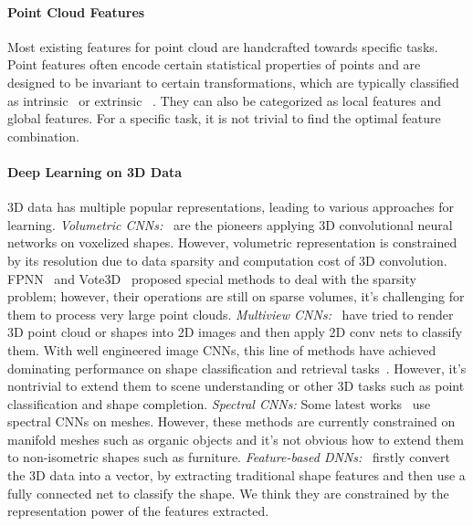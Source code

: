 \documentclass[10pt,twocolumn,letterpaper]{article}
\begin{document}
\paragraph{Point Cloud Features}
Most existing features for point cloud are handcrafted towards specific tasks. Point features often encode certain statistical properties of points and are designed to be invariant to certain transformations, which are typically classified as intrinsic~\cite{aubry2011wave, sun2009concise, bronstein2010scale} or extrinsic ~\cite{rusu2008aligning, rusu2009fast, ling2007shape, johnson1999using, chen2003visual}.  They can also be categorized as local features and global features. For a specific task, it is not trivial to find the optimal feature combination.










\paragraph{Deep Learning on 3D Data}


3D data has multiple popular representations, leading to various approaches for learning. 
\emph{Volumetric CNNs:}~\cite{wu20153d, maturana2015voxnet, qi2016volumetric} are the pioneers applying 3D convolutional neural networks on voxelized shapes. However, volumetric representation is constrained by its resolution due to data sparsity and computation cost of 3D convolution. FPNN~\cite{li2016fpnn} and Vote3D~\cite{wang2015voting} proposed special methods to deal with the sparsity problem; however, their operations are still on sparse volumes, it's challenging for them to process very large point clouds. 
\emph{Multiview CNNs:}~\cite{su15mvcnn, qi2016volumetric} have tried to render 3D point cloud or shapes into 2D images and then apply 2D conv nets to classify them. With well engineered image CNNs, this line of methods have achieved dominating performance on shape classification and retrieval tasks~\cite{savvashrec}. However, it's nontrivial to extend them to scene understanding or other 3D tasks such as point classification and shape completion. 
\emph{Spectral CNNs:} Some latest works~\cite{bruna2013spectral, masci2015geodesic} use spectral CNNs on meshes. However, these methods are currently constrained on manifold meshes such as organic objects and it's not obvious how to extend them to non-isometric shapes such as furniture. 
\emph{Feature-based DNNs:}~\cite{fang20153d,guo20153d} firstly convert the 3D data into a vector, by extracting traditional shape features and then use a fully connected net to classify the shape. We think they are constrained by the representation power of the features extracted.
\end{document}
